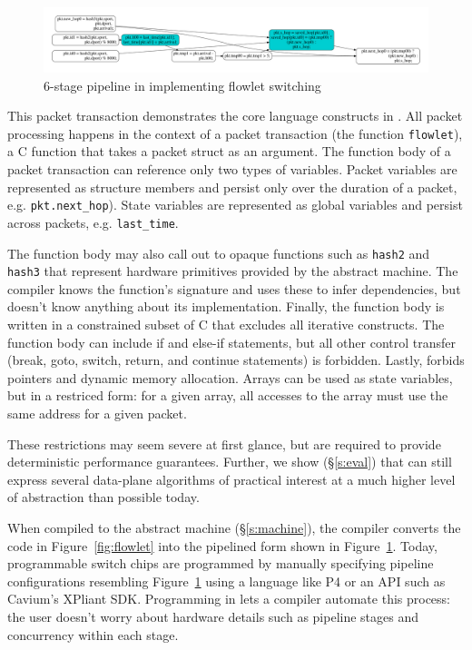 \begin{figure}[!t]
  \includegraphics[width=\textwidth]{pipe.pdf}
  \caption{6-stage pipeline in \absmachine implementing flowlet switching}
  \label{fig:pipeline}
\end{figure}

This packet transaction demonstrates the core language constructs in
\pktlanguage. All packet processing happens in the context of a packet
transaction (the function \texttt{flowlet}), a C function that takes a packet
struct as an argument. The function body of a packet transaction can reference
only two types of variables. Packet variables are represented as structure
members and persist only over the duration of a packet, e.g.
\texttt{pkt.next\_hop}). State variables are represented as global variables
and persist across packets, e.g. \texttt{last\_time}.

The function body may also call out to opaque functions such as \texttt{hash2}
and \texttt{hash3} that represent hardware primitives provided by the abstract
machine. The \pktlanguage compiler knows the function's signature and uses
these to infer dependencies, but doesn't know anything about its
implementation. Finally, the function body is written in a constrained subset
of C that excludes all iterative constructs. The function body can include if
and else-if statements, but all other control transfer (break, goto, switch,
return, and continue statements) is forbidden. Lastly, \pktlanguage forbids
pointers and dynamic memory allocation. Arrays can be used as state variables,
but in a restriced form: for a given array, all accesses to the array must use
the same address for a given packet.

These restrictions may seem severe at first glance, but are required to provide
deterministic performance guarantees. Further, we show (\S\ref{s:eval}) that
\pktlanguage can still express several data-plane algorithms  of practical
interest at a much higher level of abstraction than possible today.

When compiled to the \absmachine abstract machine (\S\ref{s:machine}), the
\pktlanguage compiler converts the code in Figure~\ref{fig:flowlet} into the
pipelined form shown in Figure~\ref{fig:pipeline}. Today, programmable switch
chips are programmed by manually specifying pipeline configurations resembling
Figure~\ref{fig:pipeline} using a language like P4 or an API such as Cavium's
XPliant SDK. Programming in \pktlanguage lets a compiler automate this process:
the user doesn't worry about hardware details such as pipeline stages and
concurrency within each stage.

